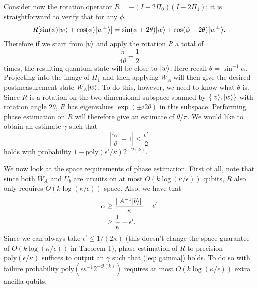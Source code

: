 \documentclass[11pt]{article}
\theoremstyle{definition}
\theoremstyle{remark}
\newcommand{\poly}{\textrm{poly}}
\begin{document}
Consider now the rotation operator $R=-(I-2\Pi_0)(I-2\Pi_1)$; it is straightforward to verify that for any $\phi$,
\begin{equation}
R[\sin(\phi) {\left\vert{w}\right\rangle} + \cos(\phi) {\left\vert{w^\perp}\right\rangle}] = \sin(\phi + 2\theta) {\left\vert{w}\right\rangle} + \cos(\phi + 2\theta) {\left\vert{w^\perp}\right\rangle}.
\end{equation}
Therefore if we start from ${\left\vert{v}\right\rangle}$ and apply the rotation $R$ a total of
\begin{equation}
\frac{\pi}{4\theta} - \frac{1}{2}
\end{equation}
times, the resulting quantum state will be close to ${\left\vert{w}\right\rangle}$. Here recall $\theta = \sin^{-1}\alpha$. Projecting into the image of $\Pi_1$ and then applying $W_A$ will then give the desired postmeasurement state $W_A{\left\vert{w}\right\rangle}$. To do this, however, we need to know what $\theta$ is. Since $R$ is a rotation on the two-dimensional subspace spanned by $\{{\left\vert{v}\right\rangle},{\left\vert{w}\right\rangle}\}$ with rotation angle $2\theta$, $R$ has eigenvalues $\exp(\pm i2\theta)$ in this subspace. Performing phase estimation on $R$ will therefore give an estimate of $\theta/\pi$. We would like to obtain an estimate $\gamma$ such that 
\begin{equation} \label{eq: gamma}
\left|\frac{\gamma\pi}{\theta} - 1\right| \le  \frac{\epsilon'}{2}
\end{equation}
holds with probability $1-\poly(\epsilon' / \kappa)2^{-\mathcal{O}(k)}$.

We now look at the space requirements of phase estimation. First of all, note that since both $W_A$ and $U_b$ are circuits on at most $O(k\log(\kappa/\epsilon))$ qubits, $R$ also only requires $O(k\log(\kappa/\epsilon))$ space. Also, we have that
\begin{align}
\alpha &\ge \frac{\|A^{-1}{\left\vert{b}\right\rangle}\|}{\kappa} - \epsilon' \\
&\ge \frac{1}{\kappa} - \epsilon'.
\end{align}
Since we can always take $\epsilon' \le 1/(2\kappa)$ (this doesn't change the space guarantee of $O(k\log(\kappa/\epsilon))$ in Theorem 1), phase estimation of $R$ to precision $\poly(\epsilon/\kappa)$ suffices to output an $\gamma$ such that (\ref{eq: gamma}) holds. To do so with failure probability $\poly(\epsilon \kappa^{-1}2^{-\mathcal{O}(k)})$ requires at most $O(k\log(\kappa/\epsilon))$ extra ancilla qubits.
\end{document}
